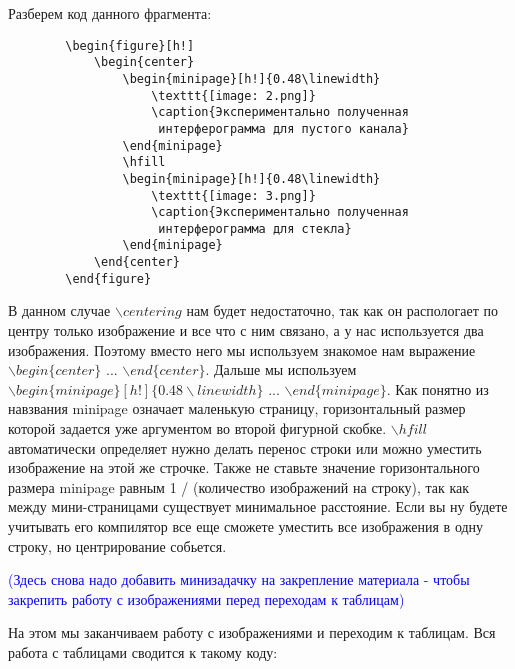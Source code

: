    Разберем код данного фрагмента:
    
    \begin{verbatim}
        \begin{figure}[h!]
            \begin{center}
                \begin{minipage}[h!]{0.48\linewidth}
                    \texttt{[image: 2.png]}
                    \caption{Экспериментально полученная
                     интерферограмма для пустого канала}
                \end{minipage}
                \hfill
                \begin{minipage}[h!]{0.48\linewidth}
                    \texttt{[image: 3.png]}
                    \caption{Экспериментально полученная
                     интерферограмма для стекла}
                \end{minipage}
            \end{center}
        \end{figure}
    \end{verbatim}
    
    В данном случае $\backslash centering$ нам будет недостаточно, так как он распологает по центру только изображение и все что с ним связано, а у нас используется два изображения. Поэтому вместо него мы используем знакомое нам выражение $\backslash begin\{center\}$ ... $\backslash end\{center\}$. Дальше мы используем $\backslash begin\{minipage\}[h!]\{0.48 \backslash linewidth\}$ ... $\backslash end\{minipage\}$. Как понятно из навзвания minipage означает маленькую страницу, горизонтальный размер которой задается уже аргументом во второй фигурной скобке. $\backslash hfill$ автоматически определяет нужно делать перенос строки или можно уместить изображение на этой же строчке. Также не ставьте значение горизонтального размера minipage равным 1 / (количество изображений на строку), так как между мини-страницами существует минимальное расстояние. Если вы ну будете учитывать его компилятор все еще сможете уместить все изображения в одну строку, но центрирование собьется.

    \textcolor{Blue}{(Здесь снова надо добавить минизадачку на закрепление материала - чтобы закрепить работу с изображениями перед переходам к таблицам)}

    На этом мы заканчиваем работу с изображениями и переходим к таблицам. Вся работа с таблицами сводится к такому коду:
    
    \vspace{0.5cm}   
    
